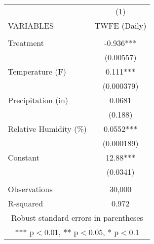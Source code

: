 \begin{tabular}{lc} \hline
 & (1) \\
VARIABLES & TWFE (Daily) \\ \hline
 &  \\
Treatment & -0.936*** \\
 & (0.00557) \\
Temperature (F) & 0.111*** \\
 & (0.000379) \\
Precipitation (in) & 0.0681 \\
 & (0.188) \\
Relative Humidity (\%) & 0.0552*** \\
 & (0.000189) \\
Constant & 12.88*** \\
 & (0.0341) \\
 &  \\
Observations & 30,000 \\
 R-squared & 0.972 \\ \hline
\multicolumn{2}{c}{ Robust standard errors in parentheses} \\
\multicolumn{2}{c}{ *** p$<$0.01, ** p$<$0.05, * p$<$0.1} \\
\end{tabular}
